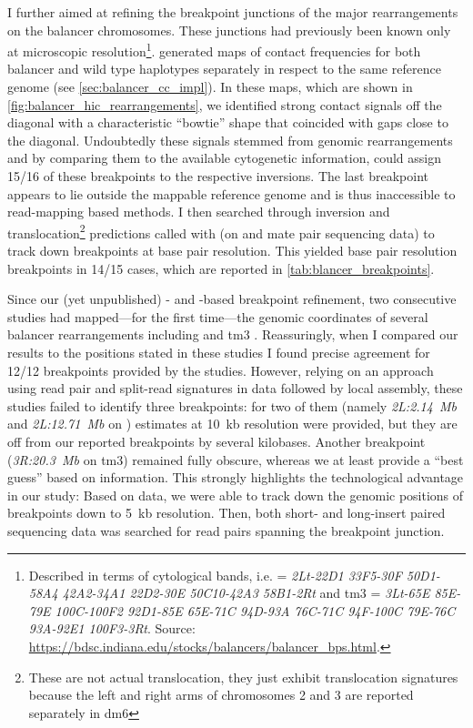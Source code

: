 I further aimed at refining the breakpoint junctions of the major rearrangements on
the balancer chromosomes. These junctions had previously been known only at microscopic
resolution\footnote{\label{footnote:balancer_karyotype}
    Described in terms of cytological bands, i.e. \cyo = \textit{2Lt-22D1
    33F5-30F 50D1-58A4 42A2-34A1 22D2-30E 50C10-42A3 58B1-2Rt} and
    \ac{tm3} = \textit{3Lt-65E 85E-79E 100C-100F2 92D1-85E 65E-71C
    94D-93A 76C-71C 94F-100C 79E-76C 93A-92E1 100F3-3Rt}.
    Source: \url{https://bdsc.indiana.edu/stocks/balancers/balancer_bps.html}.}.
\alek generated \hic maps of contact frequencies for both balancer and wild type
haplotypes separately in respect to the same reference genome (see
\cref{sec:balancer_cc_impl}). In these maps, which are shown in
\cref{fig:balancer_hic_rearrangements}, we identified strong contact signals off
the diagonal with a characteristic ``bowtie'' shape that coincided with gaps
close to the diagonal. Undoubtedly these signals stemmed from genomic
rearrangements and by comparing them to the available cytogenetic information,
\yad could assign 15/16 of these breakpoints to the respective inversions.
The last breakpoint appears to lie outside the mappable reference genome and is
thus inaccessible to read-mapping based methods.
I then searched through inversion and
translocation\footnote{These are not actual translocation, they just exhibit
    translocation signatures because the left and right arms of chromosomes 2
    and 3 are reported separately in \acs{dm6}}
predictions called with \delly (on \wgs and mate pair sequencing data) to
track down breakpoints at base pair resolution. This yielded base pair
resolution breakpoints in 14/15 cases, which are reported in
\cref{tab:blancer_breakpoints}.

Since our (yet unpublished) \hic- and \mps-based breakpoint refinement, two
consecutive studies had mapped---for the first time---the genomic coordinates of
several balancer rearrangements including \cyo and \ac{tm3}
\citep{Miller2016,Miller2018}. Reassuringly, when I compared our
results to the positions stated in these studies I found precise agreement for
12/12 breakpoints provided by the studies. However, relying on an approach using read pair and
split-read signatures in \mps data followed by local assembly, these
studies failed to identify three breakpoints: for two of them (namely \textit{2L:2.14~Mb}
and \textit{2L:12.71~Mb} on \cyo) estimates at 10~kb resolution were provided, but they are
off from our reported breakpoints by several kilobases. Another
breakpoint (\textit{3R:20.3~Mb} on \ac{tm3}) remained fully obscure, whereas we at least
provide a ``best guess'' based on \hic information. This strongly highlights the
technological advantage in our study: Based on \hic data, we were able to track down
the genomic positions of breakpoints down to 5~kb resolution. Then,
both short- and long-insert paired sequencing data was searched for read pairs
spanning the breakpoint junction.

